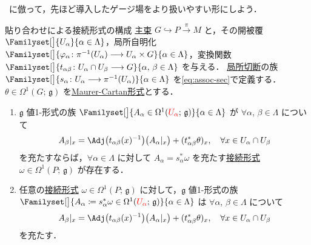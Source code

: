 \documentclass[TQFT_main]{subfiles}
\begin{document}
~\cite[第10章-1]{Nakahara2018topo2}に倣って，先ほど導入したゲージ場をより扱いやすい形にしよう．

\begin{mytheo}[label=thm:local-connection]{貼り合わせによる接続形式の構成}
    \hyperref[def.PFD]{主束} $G \hookrightarrow P \xrightarrow{\pi} M$ と，その開被覆 $\Familyset[\big]{U_\alpha}{\alpha \in \Lambda}$，局所自明化 $\Familyset[\big]{\varphi_\alpha \colon \pi^{-1}(U_\alpha) \lto U_\alpha \times G}{\alpha \in \Lambda}$，変換関数 $\Familyset[\big]{t_{\alpha\beta} \colon U_\alpha \cap U_\beta \lto G}{\alpha,\, \beta \in \Lambda}$ を与える．
    \hyperref[def.section]{局所切断}の族 $\Familyset[\big]{s_\alpha \colon U_\alpha \lto \pi^{-1}(U_\alpha)}{\alpha \in \Lambda}$ を\eqref{eq:assoc-sec}で定義する． 
    $\theta \in \Omega^1(G;\, \mathfrak{g})$ を\hyperref[def:Maurer-Cartan]{Maurer-Cartan形式}とする．
    \begin{enumerate}
        \item $\mathfrak{g}$ 値1-形式の族 $\Familyset[\big]{A_\alpha \in \Omega^1(\textcolor{red}{U_\alpha};\, \mathfrak{g})}{\alpha \in \Lambda}$ が $\forall \alpha,\, \beta \in \Lambda$ について
        \begin{align}
            \label{eq:compatible}
            A_\beta|_x = \Adj \bigl( t_{\alpha\beta}(x)^{-1} \bigr) \bigl( A_\alpha|_x \bigr) + (t_{\alpha\beta}^* \theta)_x, \quad \forall x \in U_\alpha \cap U_\beta
        \end{align}
        を充たすならば，$\forall \alpha \in \Lambda$ に対して $A_\alpha = s_\alpha^* \omega$ を充たす\hyperref[def:connection]{接続形式} $\omega \in \Omega^1(P;\, \mathfrak{g})$ が存在する．
        \item 任意の\hyperref[def:connection]{接続形式} $\omega \in \Omega^1(P;\, \mathfrak{g})$ に対して，$\mathfrak{g}$ 値1-形式の族 $\Familyset[\big]{A_\alpha \coloneqq s_\alpha^* \omega \in \Omega^1 (\textcolor{red}{U_\alpha};\, \mathfrak{g})}{\alpha \in \Lambda}$ は $\forall \alpha,\, \beta \in \Lambda$ について
        \begin{align}
            A_\beta|_x = \Adj \bigl( t_{\alpha\beta}(x)^{-1} \bigr) \bigl( A_\alpha|_x \bigr) + (t_{\alpha\beta}^* \theta)_x, \quad \forall x \in U_\alpha \cap U_\beta
        \end{align}
        を充たす．
    \end{enumerate}
\end{mytheo}
\end{document}
